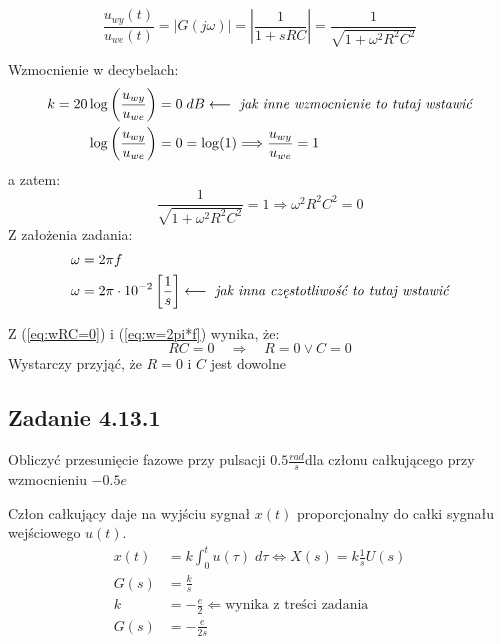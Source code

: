 \begin{equation}
\frac{u_{wy}(t)}{u_{we}(t)} = |G(j\omega)| = \left| \frac{1}{1 + sRC} \right|  = \frac{1}{\sqrt{1 + \omega^2 R^2 C^2}}
\end{equation}

Wzmocnienie w decybelach:
\begin{align}
k = 20\log\left( \frac{u_{wy}}{u_{we}}\right)  &= 0 \; dB  \longleftarrow \text{ \it{jak inne wzmocnienie to tutaj wstawić}} \\
\log\left( \frac{u_{wy}}{u_{we}}\right)  &= 0  = \log(1)  \Longrightarrow \frac{u_{wy}}{u_{we}} = 1 \\
\end{align}
a zatem:
\begin{equation}
\frac{1}{\sqrt{1 + \omega^2 R^2 C^2}} = 1 \Longrightarrow \omega^2 R^2 C^2 = 0 \label{eq:wRC=0}
\end{equation}
Z założenia zadania:
\begin{align}
\omega &= 2\pi f \\
\omega &= 2 \pi \cdot 10^{-2} \left[ \frac{1}{s} \right] \longleftarrow \text{ \it{jak inna częstotliwość to tutaj wstawić}} \label{eq:w=2pi*f} \\
\end{align}

Z (\ref{eq:wRC=0}) i (\ref{eq:w=2pi*f}) wynika, że:
\begin{equation}
RC = 0 \quad \Longrightarrow \quad R=0 \vee C=0
\end{equation}
Wystarczy przyjąć, że $R = 0$ i $C$ jest dowolne


\subsection*{Zadanie 4.13.1}
Obliczyć przesunięcie fazowe przy pulsacji $0.5 \frac{rad}{s}$dla członu całkującego przy wzmocnieniu $-0.5 e$

\vspace{1em}

Człon całkujący daje na wyjściu sygnał $x(t)$ proporcjonalny do całki sygnału wejściowego $u(t)$.
\begin{align}
x(t) &= k \int_{0}^{t} u(\tau) \; d\tau \Longleftrightarrow X(s) = k \frac{1}{s} U(s) \\
G(s) &= \frac{k}{s} \\
k &= -\frac{e}{2} \Leftarrow \text{wynika z treści zadania} \\
 \label{eq:G(s)}G(s) &=  - \frac{e}{2s}
\end{align} 

